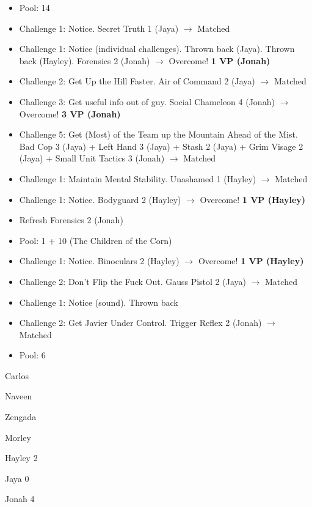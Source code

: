 {\begin{itemize}[noitemsep,topsep=0pt]
\item Pool: 14
\item Challenge 1: Notice.  Secret Truth 1 (Jaya) $\rightarrow$ Matched
\item Challenge 1: Notice (individual challenges).  Thrown back (Jaya).  Thrown back (Hayley).  Forensics 2 (Jonah) $\rightarrow$ Overcome! \textbf{1 VP (Jonah)}
\item Challenge 2: Get Up the Hill Faster.  Air of Command 2 (Jaya) $\rightarrow$ Matched 
\item Challenge 3: Get useful info out of guy.  Social Chameleon 4 (Jonah) $\rightarrow$ Overcome! \textbf{3 VP (Jonah)}
\item Challenge 5: Get (Most) of the Team up the Mountain Ahead of the Mist.  Bad Cop 3 (Jaya) + Left Hand 3 (Jaya) + Stash 2 (Jaya) + Grim Visage 2 (Jaya) + Small Unit Tactics 3 (Jonah) $\rightarrow$ Matched
\item Challenge 1: Maintain Mental Stability.  Unashamed 1 (Hayley) $\rightarrow$ Matched
\item Challenge 1: Notice.  Bodyguard 2 (Hayley) $\rightarrow$ Overcome! \textbf{1 VP (Hayley)}
\item Refresh Forensics 2 (Jonah)
\item Pool: 1 + 10 (The Children of the Corn)
\item Challenge 1: Notice.  Binoculars 2 (Hayley) $\rightarrow$ Overcome! \textbf{1 VP (Hayley)}
\item Challenge 2: Don't Flip the Fuck Out.  Gauss Pistol 2 (Jaya) $\rightarrow$ Matched
\item Challenge 1: Notice (sound).  Thrown back
\item Challenge 2: Get Javier Under Control.  Trigger Reflex 2 (Jonah) $\rightarrow$ Matched
\item Pool: 6
\end{itemize}



{\parskip=0pt
Carlos

Naveen

Zengada

Morley
}


{\parskip=0pt
Hayley 2

Jaya 0

Jonah 4
}



}

